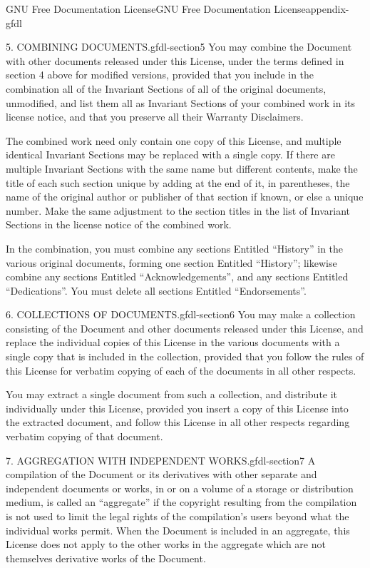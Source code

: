\documentclass[oneside,10pt,]{book}
\numberwithin{equation}{section}
\begin{document}
\begin{appendixptx}{GNU Free Documentation License}{}{GNU Free Documentation License}{}{}{appendix-gfdl}
\begin{paragraphs}{5. COMBINING DOCUMENTS.}{gfdl-section5}
\hypertarget{p-1598}{}%
You may combine the Document with other documents released under this License, under the terms defined in section 4 above for modified versions, provided that you include in the combination all of the Invariant Sections of all of the original documents, unmodified, and list them all as Invariant Sections of your combined work in its license notice, and that you preserve all their Warranty Disclaimers.%
\par
\hypertarget{p-1599}{}%
The combined work need only contain one copy of this License, and multiple identical Invariant Sections may be replaced with a single copy. If there are multiple Invariant Sections with the same name but different contents, make the title of each such section unique by adding at the end of it, in parentheses, the name of the original author or publisher of that section if known, or else a unique number. Make the same adjustment to the section titles in the list of Invariant Sections in the license notice of the combined work.%
\par
\hypertarget{p-1600}{}%
In the combination, you must combine any sections Entitled ``History'' in the various original documents, forming one section Entitled ``History''; likewise combine any sections Entitled ``Acknowledgements'', and any sections Entitled ``Dedications''. You must delete all sections Entitled ``Endorsements''.%
\end{paragraphs}%
\begin{paragraphs}{6. COLLECTIONS OF DOCUMENTS.}{gfdl-section6}%
\hypertarget{p-1601}{}%
You may make a collection consisting of the Document and other documents released under this License, and replace the individual copies of this License in the various documents with a single copy that is included in the collection, provided that you follow the rules of this License for verbatim copying of each of the documents in all other respects.%
\par
\hypertarget{p-1602}{}%
You may extract a single document from such a collection, and distribute it individually under this License, provided you insert a copy of this License into the extracted document, and follow this License in all other respects regarding verbatim copying of that document.%
\end{paragraphs}%
\begin{paragraphs}{7. AGGREGATION WITH INDEPENDENT WORKS.}{gfdl-section7}%
\hypertarget{p-1603}{}%
A compilation of the Document or its derivatives with other separate and independent documents or works, in or on a volume of a storage or distribution medium, is called an ``aggregate'' if the copyright resulting from the compilation is not used to limit the legal rights of the compilation's users beyond what the individual works permit. When the Document is included in an aggregate, this License does not apply to the other works in the aggregate which are not themselves derivative works of the Document.%

\end{paragraphs}
\end{appendixptx}
\end{document}

